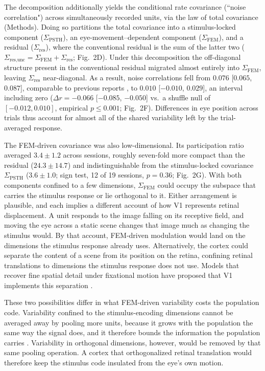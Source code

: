\documentclass{lite}
\newcommand{\Cpsth}{\Sigma_{\text{PSTH}}}
\newcommand{\Cfem}{\Sigma_{\text{FEM}}}
\begin{document}
The decomposition additionally yields the conditional rate covariance (``noise correlation") across simultaneously recorded units, via the law of total covariance (Methods). Doing so partitions the total covariance into a stimulus-locked component ($\Cpsth$), an eye-movement--dependent component ($\Cfem$), and a residual ($\Sigma_{\text{res}}$), where the conventional residual is the sum of the latter two ($\Sigma_{\text{res}, \text{unc}} = \Cfem + \Sigma_{\text{res}}$; Fig.~2D). Under this decomposition the off-diagonal structure present in the conventional residual migrated almost entirely into $\Cfem$, leaving $\Sigma_{\text{res}}$ near-diagonal. As a result, noise correlations fell from $0.076$ [$0.065$, $0.087$], comparable to previous reports \cite{smith2008spatial, mitchell2009spatial}, to $0.010$ [$-0.010$, $0.029$], an interval including zero ($\Delta r = -0.066$ [$-0.085$, $-0.050$] vs.\ a shuffle null of $[-0.012, 0.010]$, empirical $p \leq 0.001$; Fig.~2F). Differences in eye position across trials thus account for almost all of the shared variability left by the trial-averaged response.

The FEM-driven covariance was also low-dimensional. Its participation ratio averaged $3.4 \pm 1.2$ across sessions, roughly seven-fold more compact than the residual ($24.3 \pm 14.7$) and indistinguishable from the stimulus-locked covariance $\Cpsth$ ($3.6 \pm 1.0$; sign test, 12 of 19 sessions, $p = 0.36$; Fig.~2G). With both components confined to a few dimensions, $\Cfem$ could occupy the subspace that carries the stimulus response or lie orthogonal to it. Either arrangement is plausible, and each implies a different account of how V1 represents retinal displacement. A unit responds to the image falling on its receptive field, and moving the eye across a static scene changes that image much as changing the stimulus would. By that account, FEM-driven modulation would land on the dimensions the stimulus response already uses. Alternatively, the cortex could separate the content of a scene from its position on the retina, confining retinal translations to dimensions the stimulus response does not use. Models that recover fine spatial detail under fixational motion have proposed that V1 implements this separation \cite{pitkow2007neural, anderson2020high}.

These two possibilities differ in what FEM-driven variability costs the population code. Variability confined to the stimulus-encoding dimensions cannot be averaged away by pooling more units, because it grows with the population the same way the signal does, and it therefore bounds the information the population carries \cite{zohary1994correlated, moreno2014information}. Variability in orthogonal dimensions, however, would be removed by that same pooling operation. A cortex that orthogonalized retinal translation would therefore keep the stimulus code insulated from the eye's own motion.
\end{document}
